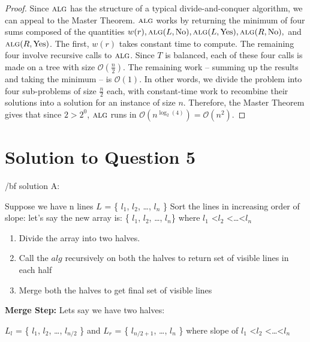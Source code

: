\documentclass[11pt]{article}
\renewcommand{\O}{\mathcal{O}}
\newcommand{\alg}{\textsc{alg}}
\begin{document}
\begin{proof}
  Since $\alg$ has the structure of a typical divide-and-conquer algorithm, we can appeal to the Master Theorem.
  $\alg$ works by returning the minimum of four sums composed of the quantities $w(r), \alg(L, \operatorname{No}), \alg(L, \operatorname{Yes}), \alg(R, \operatorname{No}),$ and $\alg(R, \operatorname{Yes})$.
  The first, $w(r)$ takes constant time to compute.
  The remaining four involve recursive calls to $\alg$.
  Since $T$ is balanced, each of these four calls is made on a tree with size $\O(\frac{n}{2})$.
  The remaining work -- summing up the results and taking the minimum -- is $\O(1)$.
  In other words, we divide the problem into four sub-problems of size $\frac{n}{2}$ each, with constant-time work to recombine their solutions into a solution for an instance of size $n$.
  Therefore, the Master Theorem gives that since $2 > 2^0$, $\alg$ runs in $\O(n^{\log_{2}(4)}) = \O(n^2)$.
\end{proof}


\section{Solution to Question 5}

{/bf solution A:}

Suppose we have n lines $L$ = \{ $l_1$, $l_2$, \dots, $l_n$ \} \newline
Sort the lines in increasing order of slope: \newline
let's say the new array is: \{ $l_1$, $l_2$, \dots , $l_n$\} where $l_1$ \textless $l_2$ \textless \dots \textless $l_n$ \newline
\begin{enumerate}
\item Divide the array into two halves. \newline
\item Call the $alg$ recursively on both the halves to return set of visible lines in each half \newline
\item Merge both the halves to get final set of visible lines \newline
\end{enumerate}
{\bf Merge Step:} \newline
Lets say we have two halves: \newline

$L_l$ = \{ $l_1$, $l_2$, \dots, $l_{n/2}$ \}  and $L_r$ = \{ $l_{n/2+1}$, \dots, $l_n$ \}  \newline
where slope of $l_1$ \textless $l_2$ \textless \dots \textless $l_n$
\end{document}
